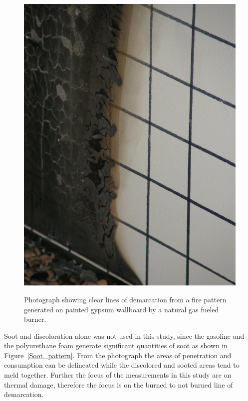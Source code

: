 \documentclass[twoside]{uocthesis}
\begin{document}
\begin{figure}[p]
	\centering
	\includegraphics[width=\textwidth]{../Figures/demarcation}  \\
	\caption[Photograph showing clear lines of demarcation]{Photograph showing clear lines of demarcation from a fire pattern generated on painted gypsum wallboard by a natural gas fueled burner.}
	\label{demarcation}
\end{figure}

Soot and discoloration alone was not used in this study, since the gasoline and the polyurethane foam generate significant quantities of soot as shown in Figure~\ref{Soot_pattern}.  From the photograph the areas of penetration and consumption can be delineated while the discolored and sooted areas tend to meld together.  Further the focus of the measurements in this study are on thermal damage, therefore the focus is on the burned to not burned line of demarcation.
\end{document}
